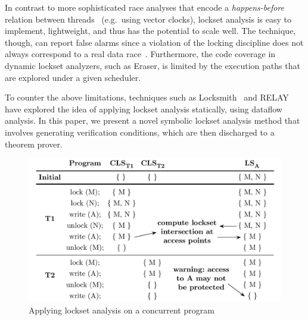 In contrast to more sophisticated race analyses that encode a \emph{happens-before} relation between threads~\cite{lamport1978time} (e.g.\ using vector clocks), lockset analysis is easy to implement, lightweight, and thus has the potential to scale well.  The technique, though, can report false alarms since a violation of the locking discipline does not always correspond to a real data race~\cite{savage1997eraser, pozniansky2003efficient, o2003hybrid, elmas2007goldilocks, flanagan2009fasttrack}. Furthermore, the code coverage in dynamic lockset analyzers, such as Eraser, is limited by the execution paths that are explored under a given scheduler.

To counter the above limitations, techniques such as Locksmith~\cite{pratikakis2006locksmith} and RELAY~\cite{voung2007relay} have explored the idea of applying lockset analysis statically, using dataflow analysis. In this paper, we present a novel symbolic lockset analysis method that involves generating verification conditions, which are then discharged to a theorem prover.

\begin{figure}[t]
\centering
\includegraphics[width=1\linewidth]{img/lockset.pdf}
\caption{Applying lockset analysis on a concurrent program}
\label{fig:locksets}
\end{figure}
